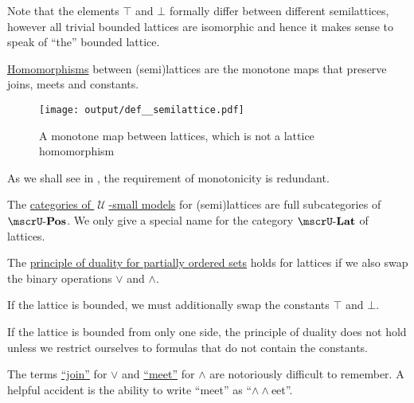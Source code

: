 \begin{definition}
\begin{thmenum}[resume=def:semilattice]
    Note that the elements \( \top \) and \( \bot \) formally differ between different semilattices, however all trivial bounded lattices are isomorphic and hence it makes sense to speak of \enquote{the} bounded lattice.

     \hyperref[def:first_order_homomorphism]{Homomorphisms} between (semi)lattices are the monotone maps that preserve joins, meets and constants.

    \begin{figure}[h]
      \centering
      \texttt{[image: output/def\_\_semilattice.pdf]}
      \caption{A monotone map between lattices, which is not a lattice homomorphism}
      \label{fig:def:semilattice/homomorphism/monotone_map_not_homomorphism}
    \end{figure}

    As we shall see in , the requirement of monotonicity is redundant.

     The \hyperref[def:category_of_small_first_order_models]{categories of \( \mscrU \)-small models} for (semi)lattices are full subcategories of \hyperref[def:partially_ordered_set/category]{\( \ucat{Pos} \)}. We only give a special name for the category \( \ucat{Lat} \) of lattices.

     The \hyperref[def:partially_ordered_set/opposite]{principle of duality for partially ordered sets} holds for lattices if we also swap the binary operations \( \vee \) and \( \wedge \).

    If the lattice is bounded, we must additionally swap the constants \( \top \) and \( \bot \).

    If the lattice is bounded from only one side, the principle of duality does not hold unless we restrict ourselves to formulas that do not contain the constants.
  \end{thmenum}
\end{definition}

\begin{remark}\label{rem:lattice_operation_etymology}
  The terms \hyperref[def:semilattice/join]{\enquote{join}} for \( \vee \) and \hyperref[def:semilattice/meet]{\enquote{meet}} for \( \wedge \) are notoriously difficult to remember. A helpful accident is the ability to write \enquote{meet} as \enquote{\( \wedge \wedge \)eet}.
\end{remark}

